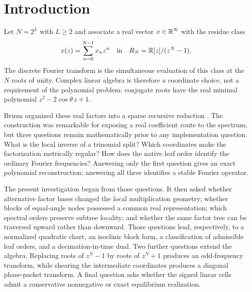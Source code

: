 \section{Introduction}
\label{sec:introduction}

Let $N=2^L$ with $L\ge2$ and associate a real vector $x\in\mathbb{R}^N$ with the residue class
\begin{equation}
  x(z)=\sum_{n=0}^{N-1}x_nz^n
  \quad\text{in}\quad
  R_N=\mathbb{R}[z]/(z^N-1).
  \label{eq:intro-polynomial}
\end{equation}
The discrete Fourier transform is the simultaneous evaluation of this class at
the $N$ roots of unity.  Complex linear algebra is therefore a coordinate
choice, not a requirement of the polynomial problem: conjugate roots have the
real minimal polynomial $z^2-2\cos\theta\,z+1$.

Bruun organized these real factors into a sparse recursive reduction
\cite{bruun1978}.  The construction was remarkable for exposing a real
coefficient route to the spectrum, but three questions remain mathematically
prior to any implementation question.  What is the local inverse of a
trinomial split?  Which coordinates make the factorization metrically regular?
How does the native leaf order identify the ordinary Fourier frequencies?
Answering only the first question gives an exact polynomial reconstruction;
answering all three identifies a stable Fourier operator.

The present investigation began from those questions.  It then asked whether
alternative factor bases changed the local multiplication geometry; whether
blocks of equal-angle nodes possessed a common real representation; which
spectral orders preserve subtree locality; and whether the same factor tree can
be traversed upward rather than downward.  Those questions lead, respectively,
to a normalized quadratic chart, an isoclinic block form, a classification of
admissible leaf orders, and a decimation-in-time dual.  Two further questions
extend the algebra.  Replacing roots of $z^N-1$ by roots of $z^N+1$ produces an
odd-frequency transform, while shearing the intermediate coordinates produces
a diagonal phase-packet transform.  A final question asks whether the signed
linear cells admit a conservative nonnegative or exact equilibrium
realization.

